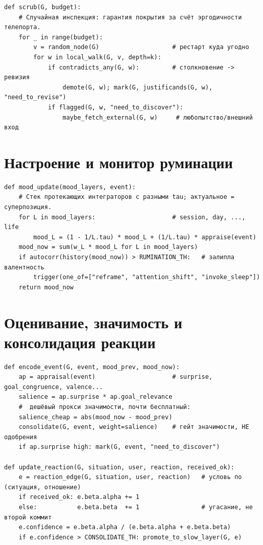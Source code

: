 \begin{lstlisting}[style=pseudo]
def scrub(G, budget):
    # Случайная инспекция: гарантия покрытия за счёт эргодичности телепорта.
    for _ in range(budget):
        v = random_node(G)                    # рестарт куда угодно
        for w in local_walk(G, v, depth=k):
            if contradicts_any(G, w):         # столкновение -> ревизия
                demote(G, w); mark(G, justificands(G, w), "need_to_revise")
            if flagged(G, w, "need_to_discover"):
                maybe_fetch_external(G, w)     # любопытство/внешний вход
\end{lstlisting}

\section{Настроение и монитор руминации}

\begin{lstlisting}[style=pseudo]
def mood_update(mood_layers, event):
    # Стек протекающих интеграторов с разными tau; актуальное = суперпозиция.
    for L in mood_layers:                     # session, day, ..., life
        mood_L = (1 - 1/L.tau) * mood_L + (1/L.tau) * appraise(event)
    mood_now = sum(w_L * mood_L for L in mood_layers)
    if autocorr(history(mood_now)) > RUMINATION_TH:   # залипла валентность
        trigger(one_of=["reframe", "attention_shift", "invoke_sleep"])
    return mood_now
\end{lstlisting}

\section{Оценивание, значимость и консолидация реакции}

\begin{lstlisting}[style=pseudo]
def encode_event(G, event, mood_prev, mood_now):
    ap = appraisal(event)                     # surprise, goal_congruence, valence...
    salience = ap.surprise * ap.goal_relevance
    #  дешёвый прокси значимости, почти бесплатный:
    salience_cheap = abs(mood_now - mood_prev)
    consolidate(G, event, weight=salience)    # гейт значимости, НЕ одобрения
    if ap.surprise high: mark(G, event, "need_to_discover")

def update_reaction(G, situation, user, reaction, received_ok):
    e = reaction_edge(G, situation, user, reaction)   # условь по (ситуация, отношение)
    if received_ok: e.beta.alpha += 1
    else:           e.beta.beta  += 1                 # угасание, не второй коммит
    e.confidence = e.beta.alpha / (e.beta.alpha + e.beta.beta)
    if e.confidence > CONSOLIDATE_TH: promote_to_slow_layer(G, e)
\end{lstlisting}

